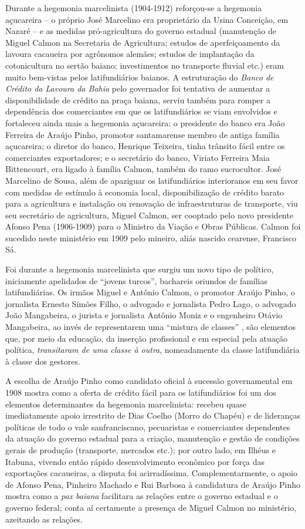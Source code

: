 Durante a hegemonia marcelinista (1904-1912) reforçou-se a hegemonia açucareira -- o próprio José Marcelino era proprietário da Usina Conceição, em Nazaré -- e as medidas pró-agricultura do governo estadual (manutenção de Miguel Calmon na Secretaria de Agricultura; estudos de aperfeiçoamento da lavoura cacaueira por agrônomos alemães; estudos de implantação da cotonicultura no sertão baiano; investimentos no transporte fluvial etc.) eram muito bem-vistas pelos latifundiários baianos. A estruturação do \textit{Banco de Crédito da Lavoura da Bahia} pelo governador foi tentativa de aumentar a disponibilidade de crédito na praça baiana, serviu também para romper a dependência dos comerciantes em que os latifundiários se viam envolvidos e fortaleceu ainda mais a hegemonia açucareira: o presidente do banco era João Ferreira de Araújo Pinho, promotor santamarense membro de antiga família açucareira; o diretor do banco, Henrique Teixeira, tinha trânsito fácil entre os comerciantes exportadores; e o secretário do banco, Viriato Ferreira Maia Bittencourt, era ligado à família Calmon, também do ramo sucrocultor. José Marcelino de Sousa, além de apaziguar os latifundiários interioranos em seu favor com medidas de estímulo à economia local, disponibilização de crédito barato para a agricultura e instalação ou renovação de infraestruturas de transporte, viu seu secretário de agricultura, Miguel Calmon, ser cooptado pelo novo presidente Afonso Pena (1906-1909) para o Ministro da Viação e Obras Públicas. Calmon foi sucedido neste ministério em 1909 pelo mineiro, aliás nascido cearense, Francisco Sá.

Foi durante a hegemonia marcelinista que surgiu um novo tipo de político, iniciamente apelidados de ``jovens turcos'', bachareis oriundos de famílias latifundiárias. Os irmãos Miguel e Antônio Calmon, o promotor Araújo Pinho, o jornalista Ernesto Simões Filho, o advogado e jornalista Pedro Lago, o advogado João Mangabeira, o jurista e jornalista Antônio Moniz e o engenheiro Otávio Mangabeira, ao invés de representarem uma ``mistura de classes'' \cite[p.~93]{pang_coronelismo_1979}, são elementos que, por meio da educação, da inserção profissional e em especial pela atuação política, \textit{transitaram de uma classe à outra}, nomeadamente da classe latifundiária à classe dos gestores.

A escolha de Araújo Pinho como candidato oficial à sucessão governamental em 1908 mostra como a oferta de crédito fácil para os latifundiários foi um dos elementos determinantes da hegemonia marcelinista: recebeu quase imediatamente apoio irrestrito de Dias Coelho (Morro do Chapéu) e de lideranças políticas de todo o vale sanfranciscano, pecuaristas e comerciantes dependentes da atuação do governo estadual para a criação, manutenção e gestão de condições gerais de produção (transporte, mercados etc.); por outro lado, em Ilhéus e Itabuna, vivendo então rápido desenvolvimento econômico por força das exportações cacaueiras, a disputa foi acirradíssima. Complementarmente, o apoio de Afonso Pena, Pinheiro Machado e Rui Barbosa à candidatura de Araújo Pinho mostra como a \textit{pax baiana} facilitara as relações entre o governo estadual e o governo federal; conta aí certamente a presença de Miguel Calmon no ministério, azeitando as relações.

